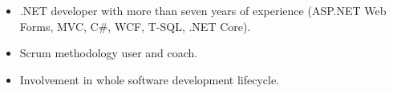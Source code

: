 \begin{itemize}
    \item .NET developer with more than seven years of experience (ASP.NET Web Forms, MVC, C\#, WCF, T-SQL, .NET Core).
    \item Scrum methodology user and coach.
    \item Involvement in whole software development lifecycle.
\end{itemize}